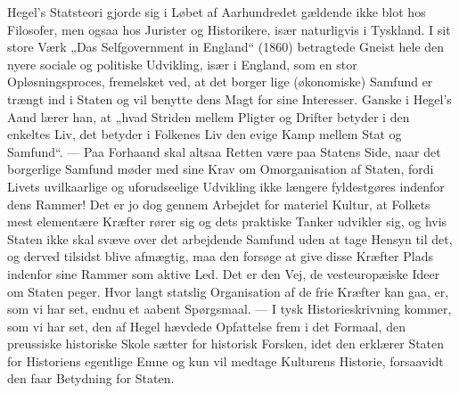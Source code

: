 \documentclass[12pt,a4paper,openany]{book}
\newcommand{\opage}[1]{\marginnote{\footnotesize\textit{[#1]}}}
\begin{document}
Hegel’s Statsteori gjorde sig i Løbet af Aarhundredet gældende
ikke blot hos Filosofer, men ogsaa hos Jurister og Historikere, især
naturligvis i Tyskland.
I sit store Værk „Das Selfgovernment in England“ (1860) betragtede
Gneist hele den nyere sociale og politiske Udvikling, især i England,
som en stor Opløsningsproces, fremelsket ved, at det borger%
\opage{107}lige (økonomiske) Samfund er trængt ind i Staten og vil benytte dens
Magt for sine Interesser. Ganske i Hegel’s Aand lærer han, at „hvad
Striden mellem Pligter og Drifter betyder i den enkeltes Liv, det betyder
i Folkenes Liv den evige Kamp mellem Stat og Samfund“. ---
Paa Forhaand skal altsaa Retten være paa Statens Side, naar det borgerlige
Samfund møder med sine Krav om Omorganisation af Staten,
fordi Livets uvilkaarlige og uforudseelige Udvikling ikke længere
fyldestgøres indenfor dens Rammer! Det er jo dog gennem Arbejdet
for materiel Kultur, at Folkets mest elementære Kræfter rører sig og
dets praktiske Tanker udvikler sig, og hvis Staten ikke skal svæve
over det arbejdende Samfund uden at tage Hensyn til det, og derved
tilsidst blive afmægtig, maa den forsøge at give disse Kræfter Plads
indenfor sine Rammer som aktive Led. Det er den Vej, de vesteuropæiske
Ideer om Staten peger. Hvor langt statslig Organisation af de
frie Kræfter kan gaa, er, som vi har set, endnu et aabent Spørgsmaal.
--- I tysk Historieskrivning kommer, som vi har set, den af
Hegel hævdede Opfattelse frem i det Formaal, den preussiske historiske
Skole sætter for historisk Forsken, idet den erklærer Staten
for Historiens egentlige Emne og kun vil medtage Kulturens Historie,
forsaavidt den faar Betydning for Staten.
\end{document}
